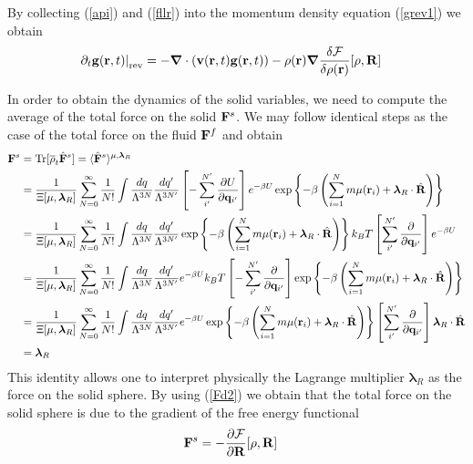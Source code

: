 \documentclass[a4paper,openright,12pt]{book}
\begin{document}
By  collecting (\ref{api})  and  (\ref{fllr})  into  the  momentum  density  equation (\ref{grev1}) we obtain
\begin{align}
\left.\partial_t {\bf g}({\bf r},t)\right|_{\rm rev} 
&=-\boldsymbol{\nabla}\cdot\left({\bf v}({\bf r},t)  {\bf g}({\bf r},t)  \right)
-\rho({\bf r})\boldsymbol{\nabla}
\frac{\delta {\cal F}}{\delta\rho({\bf r})}[\rho,{\bf R}]
\label{grev}
\end{align}

In order to obtain the dynamics of the solid variables, we need to compute the average of the total force on the solid ${\bf F}^s$. We may follow identical steps as the case of the total force on the fluid ${\bf F}^f$ and obtain
\begin{align}
{\bf F}^s&={\rm Tr}[\overline{\rho}_t \hat{\bf F}^s]=
 \langle \hat{\bf F}^s\rangle^{\mu,\boldsymbol{\lambda}_R} 
\nonumber\\
&=\frac{1}{\Xi[\mu,\boldsymbol{\lambda}_R]}
 \sum_{N=0}^\infty \frac{1}{N!}
\int \frac{dq}{\Lambda^{3N}}\frac{dq'}{\Lambda^{3N'}}
\left[-\sum^{N'}_{i'}\frac{\partial U}{\partial {\bf q}_{i'}}\right]
e^{-\beta U}
\exp\left\{-\beta  \left(\sum_{i=1}^N m\mu({\bf
    r}_i)+ \boldsymbol{\lambda}_R\cdot\hat{\bf R}\right)\right\}
\nonumber\\
&=
\frac{1}{\Xi[\mu,\boldsymbol{\lambda}_R]}
 \sum_{N=0}^\infty \frac{1}{N!}
\int \frac{dq}{\Lambda^{3N}}\frac{dq'}{\Lambda^{3N'}}
\exp\left\{-\beta  \left(\sum_{i=1}^N m\mu({\bf
    r}_i)+ \boldsymbol{\lambda}_R\cdot\hat{\bf R}\right)\right\}
k_BT\left[\sum^{N'}_{i'}\frac{\partial }{\partial {\bf q}_{i'}}\right]e^{-\beta U}
\nonumber\\
&=
\frac{1}{\Xi[\mu,\boldsymbol{\lambda}_R]}
 \sum_{N=0}^\infty \frac{1}{N!}
\int \frac{dq}{\Lambda^{3N}}\frac{dq'}{\Lambda^{3N'}}
e^{-\beta U}
k_BT\left[-\sum^{N'}_{i'}\frac{\partial }{\partial {\bf q}_{i'}}\right]\exp\left\{-\beta  \left(\sum_{i=1}^N m\mu({\bf
    r}_i)+ \boldsymbol{\lambda}_R\cdot\hat{\bf R}\right)\right\}
\nonumber\\
&=
\frac{1}{\Xi[\mu,\boldsymbol{\lambda}_R]}
 \sum_{N=0}^\infty \frac{1}{N!}
\int \frac{dq}{\Lambda^{3N}}\frac{dq'}{\Lambda^{3N'}}
e^{-\beta U}
\exp\left\{-\beta  \left(\sum_{i=1}^N m\mu({\bf
    r}_i)+ \boldsymbol{\lambda}_R\cdot\hat{\bf R}\right)\right\}
\left[\sum^{N'}_{i'}\frac{\partial }{\partial {\bf q}_{i'}}\right] \boldsymbol{\lambda}_R\cdot\hat{\bf R}
\nonumber\\
&=\boldsymbol{\lambda}_R
\label{lf}\end{align}
This  identity  allows  one  to  interpret  physically  the  Lagrange
multiplier $\boldsymbol{\lambda}_R$ as the  force on the solid sphere.
By  using (\ref{Fd2})  we obtain  that the  total force  on the  solid
sphere is due to the gradient of the free energy functional
\begin{align}
{\bf F}^s&=-\frac{\partial  {\cal F}}{\partial{\bf R}}[\rho,{\bf R}]
\label{Fls}
\end{align}
\end{document}
